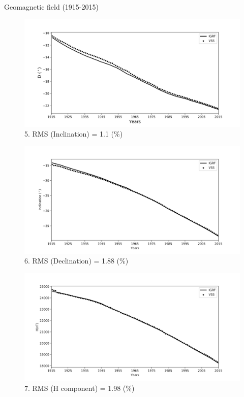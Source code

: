 \documentclass[final,t]{beamer}
\begin{document}
\begin{columns}[t]
\begin{column}{.66\linewidth}
\begin{columns}
\begin{column}{.31\linewidth}
\begin{block}{Geomagnetic field (1915-2015)}
	
	\begin{figure}
		\centering
		\includegraphics[width=1.0\linewidth]{D}
		\caption{5. RMS (Inclination) = 1.1 (\%)}
		\label{fo}
	\end{figure}
	
	
	\begin{figure}
		\centering
		\includegraphics[width=1.0\linewidth]{I}
		\caption{6. RMS (Declination) = 1.88 (\%)}
		\label{ico}
	\end{figure}
	
	
	\begin{figure}
		\centering
		\includegraphics[width=1.0\linewidth]{H}
		\caption{7. RMS (H component) = 1.98 (\%)}
		\label{f_Sintetico}
	\end{figure}
	

\end{block}
\end{column}
\end{columns}
\end{column}
\end{columns}
\end{document}
